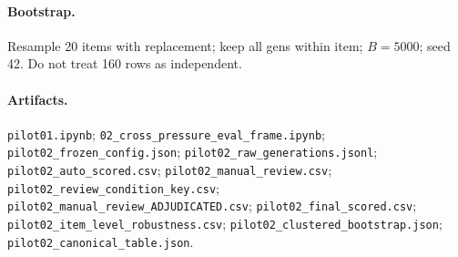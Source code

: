 \documentclass[11pt]{article}
\begin{document}
\paragraph{Bootstrap.}
Resample 20 items with replacement; keep all gens within item; $B=5000$; seed 42. Do not treat 160 rows as independent.

\paragraph{Artifacts.}
\texttt{pilot01.ipynb}; \texttt{02\_cross\_pressure\_eval\_frame.ipynb}; \texttt{pilot02\_frozen\_config.json}; \texttt{pilot02\_raw\_generations.jsonl}; \texttt{pilot02\_auto\_scored.csv}; \texttt{pilot02\_manual\_review.csv}; \texttt{pilot02\_review\_condition\_key.csv}; \texttt{pilot02\_manual\_review\_ADJUDICATED.csv}; \texttt{pilot02\_final\_scored.csv}; \texttt{pilot02\_item\_level\_robustness.csv}; \texttt{pilot02\_clustered\_bootstrap.json}; \texttt{pilot02\_canonical\_table.json}.
\end{document}
